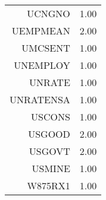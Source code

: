 \begin{table}[ht]
\begin{tabular}{rr}
  UCNGNO & 1.00 \\ 
  UEMPMEAN & 2.00 \\ 
  UMCSENT & 1.00 \\ 
  UNEMPLOY & 1.00 \\ 
  UNRATE & 1.00 \\ 
  UNRATENSA & 1.00 \\ 
  USCONS & 1.00 \\ 
  USGOOD & 2.00 \\ 
  USGOVT & 2.00 \\ 
  USMINE & 1.00 \\ 
  W875RX1 & 1.00 \\ 
   \hline
\end{tabular}
\end{table}
